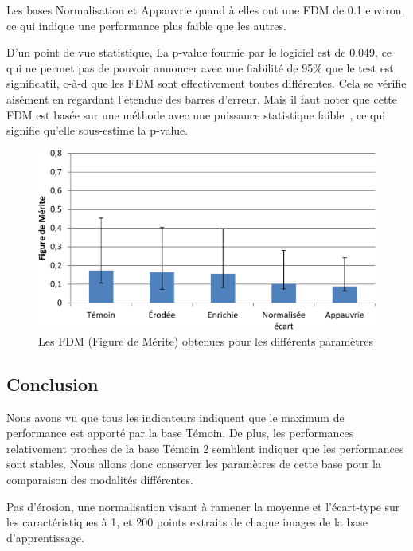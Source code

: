Les bases Normalisation et Appauvrie quand à elles ont une FDM de 0.1 environ, ce qui indique une performance plus faible que les autres.

D'un point de vue statistique, La p-value fournie par le logiciel est de 0.049, ce qui ne permet pas de pouvoir annoncer avec une fiabilité de 95\% que le test est significatif, c-à-d que les FDM sont effectivement toutes différentes. Cela se vérifie aisément en regardant l'étendue des barres d'erreur. Mais il faut noter que cette FDM est basée sur une méthode avec une puissance statistique faible~\cite{chakraborty2004observer}, ce qui signifie qu'elle sous-estime la p-value.

\begin{figure}[h!]
 \begin{center}
   \includegraphics[width=15cm]{images/FOM_param}
 \end{center}
 \caption{Les FDM (Figure de Mérite) obtenues pour les différents paramètres}
 \label{lab:fom_param}
\end{figure}

\subsection{Conclusion}

Nous avons vu que tous les indicateurs indiquent que le maximum de performance est apporté par la base Témoin. De plus, les  performances relativement proches de la base Témoin 2 semblent indiquer que les performances sont stables. Nous allons donc conserver les paramètres de cette base pour la comparaison des modalités différentes.

Pas d'érosion, une normalisation visant à ramener la moyenne et l'écart-type sur les caractéristiques à 1, et 200 points extraits de chaque images de la base d'apprentissage.
 

